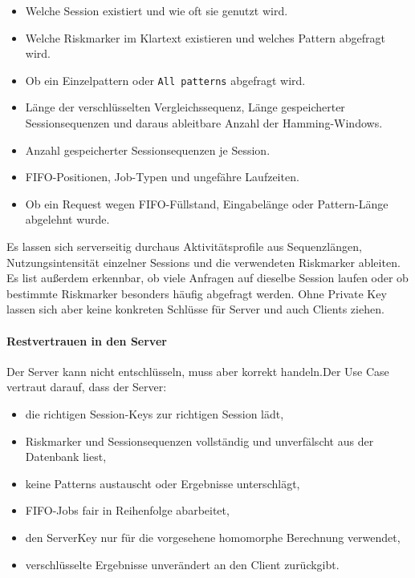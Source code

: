 \begin{itemize}
\item
  Welche Session existiert und wie oft sie genutzt wird.
\item
  Welche Riskmarker im Klartext existieren und welches Pattern
  abgefragt wird.
\item
  Ob ein Einzelpattern oder \texttt{All\ patterns} abgefragt wird.
\item
  Länge der verschlüsselten Vergleichssequenz, Länge gespeicherter
  Sessionsequenzen und daraus ableitbare Anzahl der Hamming-Windows.
\item
  Anzahl gespeicherter Sessionsequenzen je Session.
\item
  FIFO-Positionen, Job-Typen und ungefähre Laufzeiten.
\item
  Ob ein Request wegen FIFO-Füllstand, Eingabelänge oder
  Pattern-Länge abgelehnt wurde.
\end{itemize}

Es lassen sich serverseitig durchaus Aktivitätsprofile aus
Sequenzlängen, Nutzungsintensität einzelner Sessions und die
verwendeten Riskmarker ableiten. Es list außerdem erkennbar, ob viele
Anfragen auf dieselbe Session laufen oder ob bestimmte Riskmarker
besonders häufig abgefragt werden. Ohne Private Key lassen sich aber keine konkreten Schlüsse für Server und auch Clients ziehen.

\paragraph{Restvertrauen in den
Server}\label{restvertrauen-in-den-server}

Der Server kann nicht entschlüsseln, muss aber korrekt handeln.Der Use Case vertraut darauf, dass der Server:

\begin{itemize}
\item
  die richtigen Session-Keys zur richtigen Session lädt,
\item
  Riskmarker und Sessionsequenzen vollständig und unverfälscht aus der
  Datenbank liest,
\item
  keine Patterns austauscht oder Ergebnisse unterschlägt,
\item
  FIFO-Jobs fair in Reihenfolge abarbeitet,
\item
  den ServerKey nur für die vorgesehene homomorphe Berechnung
  verwendet,
\item
  verschlüsselte Ergebnisse unverändert an den Client zurückgibt.
\end{itemize}

